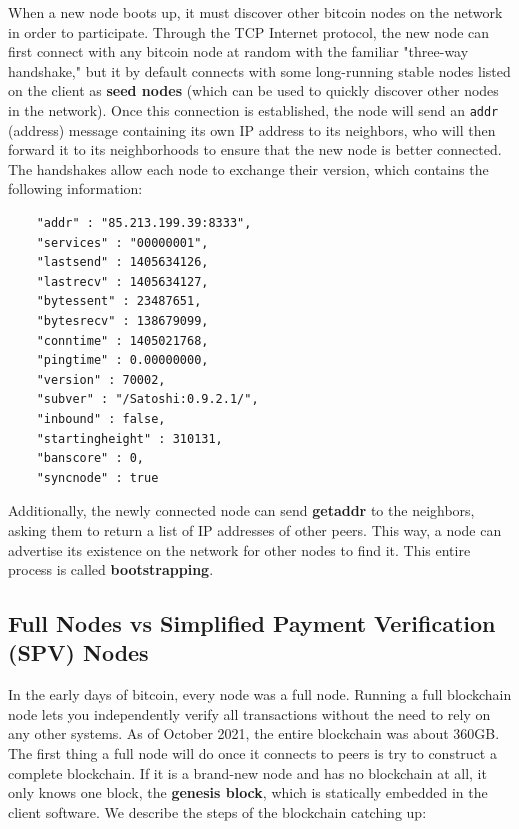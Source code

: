 \documentclass{article}
\begin{document}
    When a new node boots up, it must discover other bitcoin nodes on the network in order to participate. Through the TCP Internet protocol, the new node can first connect with any bitcoin node at random with the familiar "three-way handshake," but it by default connects with some long-running stable nodes listed on the client as \textbf{seed nodes} (which can be used to quickly discover other nodes in the network). Once this connection is established, the node will send an \texttt{addr} (address) message containing its own IP address to its neighbors, who will then forward it to its neighborhoods to ensure that the new node is better connected. The handshakes allow each node to exchange their version, which contains the following information:

    \begin{lstlisting}
    "addr" : "85.213.199.39:8333",
    "services" : "00000001",
    "lastsend" : 1405634126,
    "lastrecv" : 1405634127,
    "bytessent" : 23487651,
    "bytesrecv" : 138679099,
    "conntime" : 1405021768,
    "pingtime" : 0.00000000,
    "version" : 70002,
    "subver" : "/Satoshi:0.9.2.1/",
    "inbound" : false,
    "startingheight" : 310131,
    "banscore" : 0,
    "syncnode" : true
    \end{lstlisting}

    Additionally, the newly connected node can send \textbf{getaddr} to the neighbors, asking them to return a list of IP addresses of other peers. This way, a node can advertise its existence on the network for other nodes to find it. This entire process is called \textbf{bootstrapping}.

  \subsection{Full Nodes vs Simplified Payment Verification (SPV) Nodes}

    In the early days of bitcoin, every node was a full node. Running a full blockchain node lets you independently verify all transactions without the need to rely on any other systems. As of October 2021, the entire blockchain was about 360GB. The first thing a full node will do once it connects to peers is try to construct a complete blockchain. If it is a brand-new node and has no blockchain at all, it only knows one block, the \textbf{genesis block}, which is statically embedded in the client software. We describe the steps of the blockchain catching up:
\end{document}
